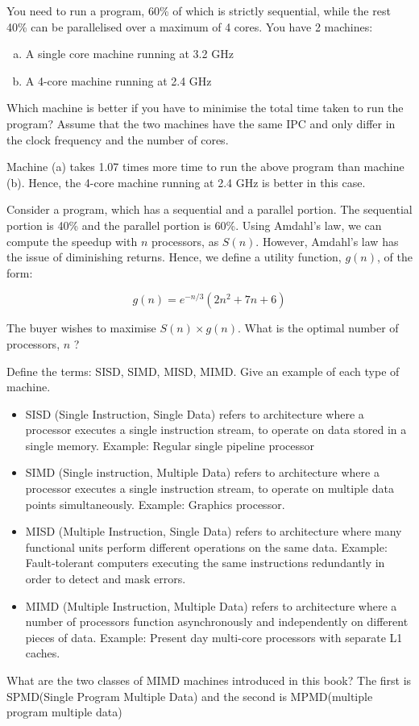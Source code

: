 \begin{ExerciseList}
\Exercise
You need to run a program, 60\% of which is strictly sequential, 
while the rest 40\% can be parallelised over a maximum of 4 cores. You 
have 2 machines:
\begin{enumerate}[(a) ]
 \item A single core machine running at 3.2 GHz
 \item A 4-core machine running at 2.4 GHz
\end{enumerate}
Which machine is better if you have to minimise the total 
time taken to run the program? Assume that the two machines have the same IPC
and only differ in the clock frequency and the number of cores.

\Answer
Machine (a) takes 1.07 times more time to run the above program than machine (b). Hence, the 4-core machine running at 2.4 GHz
is better in this case.

\Exercise[difficulty=1]
Consider a program, which has a sequential and a parallel portion. The sequential portion is 40\% and the parallel
portion is 60\%. Using Amdahl's law, we can compute the speedup with $n$ processors, as $S(n)$. However, Amdahl's law has
the issue of diminishing returns. Hence, we define a utility function, $g(n)$, of the form:

\[
g(n) = e^{-n/3} (2n^2 + 7n + 6) 
\]

The buyer wishes to maximise $S(n) \times g(n)$. What is the optimal number of processors, $n$ ?

\Exercise
Define the terms: SISD, SIMD, MISD, MIMD. Give an example of each type of machine.

\Answer
\begin{itemize}
 \item SISD (Single Instruction, Single Data) refers to architecture where a processor executes a single instruction stream, 
 to operate on data stored in a single memory. Example: Regular single pipeline processor
 \item SIMD (Single instruction, Multiple Data) refers to architecture where a processor executes a single instruction stream, 
 to operate on multiple data points simultaneously. Example: Graphics processor.
 \item MISD (Multiple Instruction, Single Data) refers to architecture where many functional units perform different operations 
 on the same data. Example: Fault-tolerant computers executing the same instructions redundantly in order to detect and mask errors.
 \item MIMD (Multiple Instruction, Multiple Data) refers to architecture where a number of processors function asynchronously and
 independently on different pieces of data. Example: Present day multi-core processors with separate L1 caches.
\end{itemize}

\Exercise
What are the two classes of MIMD machines introduced in this book?
\Answer
The first is SPMD(Single Program Multiple Data) and the second is MPMD(multiple program multiple data)
\end{ExerciseList}

